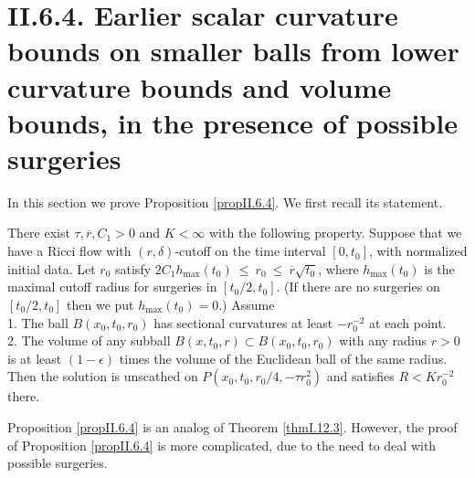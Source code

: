 \section{II.6.4. Earlier scalar curvature bounds on smaller balls from
lower curvature bounds and volume bounds, in the presence of possible
surgeries}

In this section we prove Proposition \ref{propII.6.4}.
We first recall its statement.
\begin{proposition}
  \label{prop:kl-earlier-scalar-curvature-bounds-smaller-balls-from-lower-curvature-bound-existence-scalar-curvature}

There exist $\tau, \overline{r}, C_1 > 0$ and $K < \infty$
with the
following property. Suppose that we have a Ricci flow with $(r, \delta)$-cutoff
on the time interval $[0, t_0]$, with normalized initial data.  Let
$r_0$ satisfy
$2C_1 h_{\max}(t_0) \: \le \: r_0 \: \le \: \overline{r} \sqrt{t_0}$,
where $h_{\max}(t_0)$ is the maximal cutoff radius for surgeries in
$[t_0/2, t_0]$. (If there are no surgeries on $[t_0/2, t_0]$ then we put
$h_{\max}(t_0) = 0$.)
Assume \\
1. The ball $B(x_0, t_0, r_0)$ has sectional curvatures at least $- r_0^{-2}$
at each point. \\
2. The volume of any subball $B(x, t_0, r) \subset B(x_0, t_0, r_0)$ with
any radius $r > 0$ is at least $(1-\epsilon)$ times the volume of the
Euclidean ball of the same radius.\\

Then the solution is unscathed on
$P(x_0, t_0, r_0/4, - \tau r_0^2)$ and satisfies $R < K r_0^{-2}$
there.
\end{proposition}

Proposition \ref{propII.6.4}
is an analog of Theorem \ref{thmI.12.3}.  However, the proof of Proposition
\ref{propII.6.4} is more complicated, due to the need to deal with possible
surgeries.

